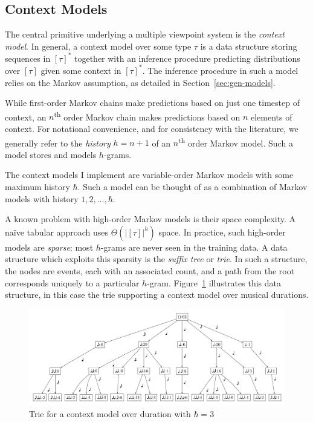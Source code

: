 \documentclass[12pt,a4paper,twoside,openright]{report}
\begin{document}
\subsection{Context Models}\label{sec:ctx-model-prep}

The central primitive underlying a multiple viewpoint system is the
\emph{context model}. In general, a context model over some type $\tau$ is a
data structure storing sequences in $[\tau]^*$ together with an inference
procedure predicting distributions over $[\tau]$ given some context in
$[\tau]^*$. The inference procedure in such a model relies on the Markov
assumption, as detailed in Section~\ref{sec:gen-models}.

While first-order Markov chains make predictions based on just one timestep of
context, an $n$\textsuperscript{th} order Markov chain makes predictions based
on $n$ elements of context. For notational convenience, and for consistency with
the literature, we generally refer to the \emph{history} $h = n+1$ of an
$n$\textsuperscript{th} order Markov model. Such a model stores and models
$h$-grams.

The context models I implement are variable-order Markov models with some
maximum history $\hbar$. Such a model can be thought of as a combination of
Markov models with history $1,2,\ldots,\hbar$. 

A known problem with high-order Markov models is their space complexity. A naïve
tabular approach uses $\Theta(|[\tau]|^h)$ space.  In practice, such high-order
models are \emph{sparse}: most $h$-grams are never seen in the training data. A
data structure which exploits this sparsity is the \emph{suffix tree} or
\emph{trie}.  In such a structure, the nodes are events, each with an associated
count, and a path from the root corresponds uniquely to a particular $h$-gram.
Figure~\ref{fig:dur-trie} illustrates this data structure, in this case the trie
supporting a context model over musical durations. 

\begin{figure}[H]
\centering
\includegraphics[width=455pt]{figs/duration_vp.pdf}
\caption{Trie for a context model over duration with $\hbar = 3$}
\label{fig:dur-trie}
\end{figure}
\end{document}
